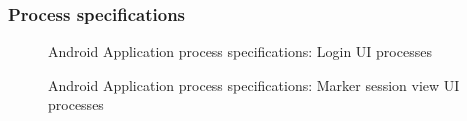 \subsubsection{Process specifications}
\begin{figure}[H]
\centering	
{}
\caption{Android Application process specifications: Login UI processes}
\end{figure}

\begin{figure}[H]
\centering	
{}
\caption{Android Application process specifications: Marker session view UI processes}
\end{figure}


